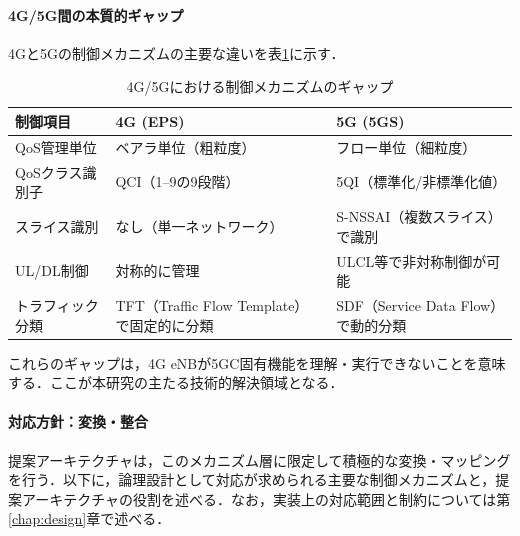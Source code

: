 \paragraph{4G/5G間の本質的ギャップ}

4Gと5Gの制御メカニズムの主要な違いを表\ref{tab:mechanism_gap}に示す．

\begin{table}[htbp]
\centering
\caption{4G/5Gにおける制御メカニズムのギャップ}
\label{tab:mechanism_gap}
\begin{tabular}{|p{3cm}|p{5cm}|p{5cm}|}
\hline
\textbf{制御項目} & \textbf{4G (EPS)} & \textbf{5G (5GS)} \\
\hline
QoS管理単位 & ベアラ単位（粗粒度） & フロー単位（細粒度） \\
\hline
QoSクラス識別子 & QCI（1--9の9段階） & 5QI（標準化/非標準化値） \\
\hline
スライス識別 & なし（単一ネットワーク） & S-NSSAI（複数スライス）で識別 \\
\hline
UL/DL制御 & 対称的に管理 & ULCL等で非対称制御が可能 \\
\hline
トラフィック分類 & TFT（Traffic Flow Template）で固定的に分類 & SDF（Service Data Flow）で動的分類 \\
\hline
\end{tabular}
\end{table}

これらのギャップは，4G eNBが5GC固有機能を理解・実行できないことを意味する．ここが本研究の主たる技術的解決領域となる．

\paragraph{対応方針：変換・整合}

提案アーキテクチャは，このメカニズム層に限定して積極的な変換・マッピングを行う．以下に，論理設計として対応が求められる主要な制御メカニズムと，提案アーキテクチャの役割を述べる．なお，実装上の対応範囲と制約については第\ref{chap:design}章で述べる．

